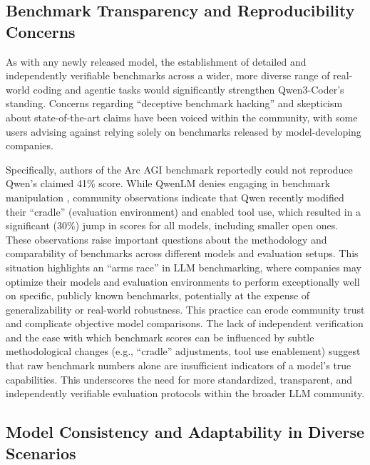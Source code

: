 \subsection{Benchmark Transparency and Reproducibility Concerns}

As with any newly released model, the establishment of detailed and independently verifiable benchmarks across a wider, more diverse range of real-world coding and agentic tasks would significantly strengthen Qwen3-Coder's standing. Concerns regarding ``deceptive benchmark hacking'' and skepticism about state-of-the-art claims have been voiced within the community, with some users advising against relying solely on benchmarks released by model-developing companies.\cite{youtube_qwen3coder_review_2025, reddit_localllama_qwen_benchmarks_2025}

Specifically, authors of the Arc AGI benchmark reportedly could not reproduce Qwen's claimed 41\% score.\cite{youtube_qwen3coder_review_2025, reddit_localllama_qwen_benchmarks_2025} While QwenLM denies engaging in benchmark manipulation \cite{reddit_localllama_qwen_benchmarks_2025}, community observations indicate that Qwen recently modified their ``cradle'' (evaluation environment) and enabled tool use, which resulted in a significant (30\%) jump in scores for all models, including smaller open ones.\cite{reddit_singularity_kimi_qwen3_2025} These observations raise important questions about the methodology and comparability of benchmarks across different models and evaluation setups. This situation highlights an ``arms race'' in LLM benchmarking, where companies may optimize their models and evaluation environments to perform exceptionally well on specific, publicly known benchmarks, potentially at the expense of generalizability or real-world robustness. This practice can erode community trust and complicate objective model comparisons. The lack of independent verification and the ease with which benchmark scores can be influenced by subtle methodological changes (e.g., ``cradle'' adjustments, tool use enablement) suggest that raw benchmark numbers alone are insufficient indicators of a model's true capabilities. This underscores the need for more standardized, transparent, and independently verifiable evaluation protocols within the broader LLM community.

\subsection{Model Consistency and Adaptability in Diverse Scenarios}

